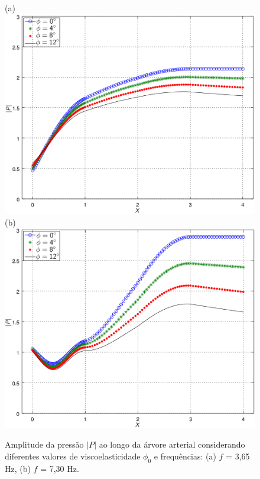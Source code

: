 \documentclass[
        english,			
        brazil			        %
        ,<...>]{abntbibufjf}
\begin{document}
\begin{figure}[!htbp]
	\centering
	(a) \\
	\includegraphics[scale=0.7]{figure4-result-new/Fig4_P_f3_65_visco_new2.png}\\
	(b)\\
	\includegraphics[scale=0.7]{figure4-result-new/Fig4_P_f7_30_visco_new2.png}\\
	\caption{Amplitude da pressão $|P|$ ao longo da árvore arterial considerando diferentes valores de viscoelasticidade $\phi_0$ e frequências: (a) $f$ = 3,65 Hz, (b)  $f$ = 7,30 Hz. }
	\label{fig4a:arterial-tree}%
\end{figure}
\end{document}
